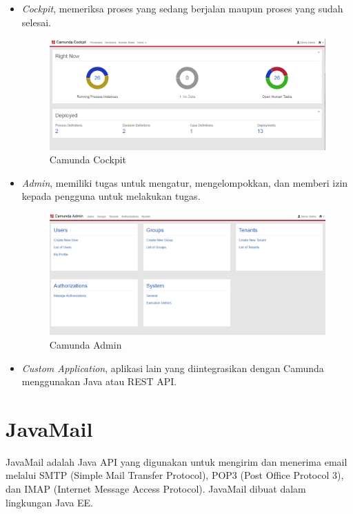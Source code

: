 \begin{itemize}
	\item \textit{Cockpit}, memeriksa proses yang sedang berjalan maupun proses yang sudah selesai.
	\begin{figure}[H]
	\centering
	\includegraphics[scale=0.4]{Gambar/Bab-2/bpms/camundaCockpit}
	\caption{Camunda Cockpit} 
	\label{fig:camundacockpit}
\end{figure}
	
\item \textit{Admin}, memiliki tugas untuk mengatur, mengelompokkan, dan memberi izin kepada pengguna untuk melakukan tugas.
	\begin{figure}[H]
	\centering
	\includegraphics[scale=0.4]{Gambar/Bab-2/bpms/camundaAdmin}
	\caption{Camunda Admin} 
	\label{fig:camundaadmin}
\end{figure}

	\item \textit{Custom Application}, aplikasi lain yang diintegrasikan dengan Camunda menggunakan Java atau REST API.
	
\end{itemize}




	



\section{JavaMail}
\label{javamail}
JavaMail adalah Java API yang digunakan untuk mengirim dan menerima email melalui SMTP (Simple Mail Transfer Protocol), POP3 (Post Office Protocol 3), dan IMAP (Internet Message Access Protocol)\cite{javamail}. JavaMail dibuat dalam lingkungan Java EE.  

